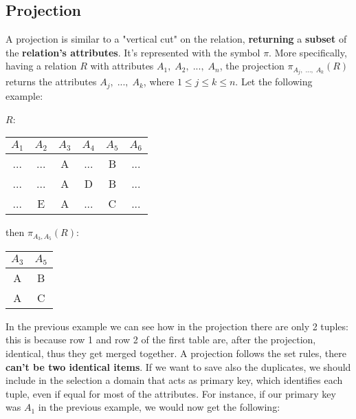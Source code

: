 \subsection{Projection}

A projection is similar to a "vertical cut" on the relation, \textbf{returning} a \textbf{subset} of the \textbf{relation's attributes}. It's represented with the symbol $\pi$. More specifically, having a relation $R$ with attributes $A_1, \; A_2, \; ..., \; A_n$, the projection $\pi_{A_j, \; ..., \; A_k}(R)$ returns the attributes $A_j, \; ..., \; A_k$, where $1 \leq j \leq k \leq n$. Let the following example:
\begin{center}
    $R$: \quad \begin{tabular}{|c|c|c|c|c|c|}
        \hline \rowcolor{maindoccol!60}
        $A_1$ & $A_2$ & $A_3$ & $A_4$ & $A_5$ & $A_6$ \\
        \hline
        ... & ... & A & ... & B & ... \\
        \hline
        ... & ... & A & D & B & ... \\
        \hline
        ... & E & A & ... & C & ... \\
        \hline
    \end{tabular}
    \quad then $\pi_{A_3, A_5}(R)$: \quad \begin{tabular}{|c|c|}
        \hline \rowcolor{maindoccol!60}
        $A_3$ & $A_5$ \\
        \hline
        A & B \\
        \hline
        A & C \\
        \hline
    \end{tabular}
\end{center}

In the previous example we can see how in the projection there are only 2 tuples: this is because row 1 and row 2 of the first table are, after the projection, identical, thus they get merged together. A projection follows the set rules, there \textbf{can't be two identical items}. If we want to save also the duplicates, we should include in the selection a domain that acts as primary key, which identifies each tuple, even if equal for most of the attributes. For instance, if our primary key was $A_1$ in the previous example, we would now get the following:

